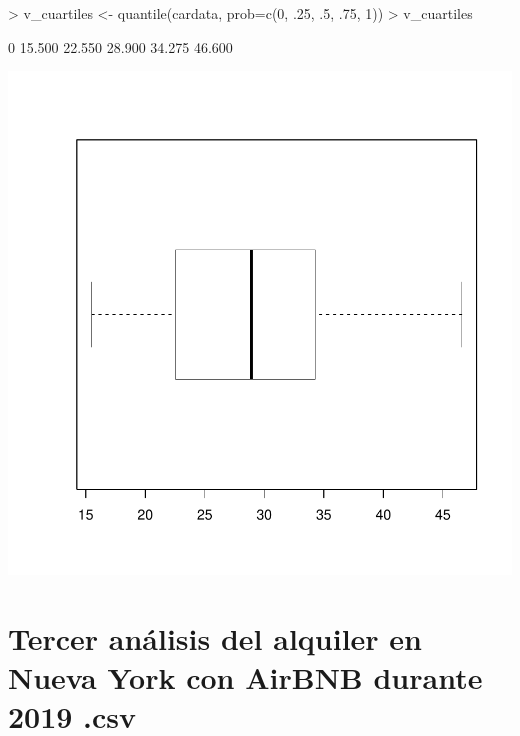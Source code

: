 \documentclass [a4paper] {article}
\begin{document}
\begin{Schunk}
\begin{Sinput}
> v_cuartiles <- quantile(cardata, prob=c(0, .25, .5, .75, 1))
> v_cuartiles
\end{Sinput}
\begin{Soutput}
    0%
15.500 22.550 28.900 34.275 46.600 
\end{Soutput}
\end{Schunk}
\includegraphics{entrega-020}


\section{Tercer análisis del alquiler en Nueva York con AirBNB durante 2019 .csv}
\end{document}
